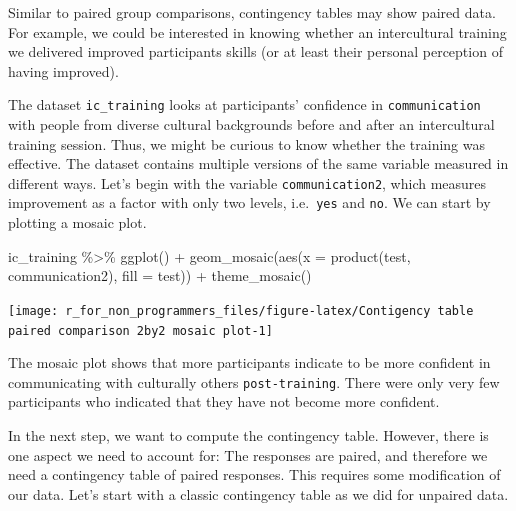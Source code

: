 \documentclass[
]{book}
\newenvironment{Shaded}{\begin{snugshade}}{\end{snugshade}}
\newcommand{\AttributeTok}[1]{\textcolor[rgb]{0.77,0.63,0.00}{#1}}
\newcommand{\FunctionTok}[1]{\textcolor[rgb]{0.00,0.00,0.00}{#1}}
\newcommand{\NormalTok}[1]{#1}
\newcommand{\SpecialCharTok}[1]{\textcolor[rgb]{0.00,0.00,0.00}{#1}}
\begin{document}
Similar to paired group comparisons, contingency tables may show paired data. For example, we could be interested in knowing whether an intercultural training we delivered improved participants skills (or at least their personal perception of having improved).

The dataset \texttt{ic\_training} looks at participants' confidence in \texttt{communication} with people from diverse cultural backgrounds before and after an intercultural training session. Thus, we might be curious to know whether the training was effective. The dataset contains multiple versions of the same variable measured in different ways. Let's begin with the variable \texttt{communication2}, which measures improvement as a factor with only two levels, i.e.~\texttt{yes} and \texttt{no}. We can start by plotting a mosaic plot.

\begin{Shaded}
\begin{Highlighting}[]
\NormalTok{ic\_training }\SpecialCharTok{\%\textgreater{}\%}
  \FunctionTok{ggplot}\NormalTok{() }\SpecialCharTok{+}
  \FunctionTok{geom\_mosaic}\NormalTok{(}\FunctionTok{aes}\NormalTok{(}\AttributeTok{x =} \FunctionTok{product}\NormalTok{(test, communication2),}
                  \AttributeTok{fill =}\NormalTok{ test)) }\SpecialCharTok{+}
  \FunctionTok{theme\_mosaic}\NormalTok{()}
\end{Highlighting}
\end{Shaded}

\begin{center}\texttt{[image: r\_for\_non\_programmers\_files/figure-latex/Contigency table paired comparison 2by2 mosaic plot-1]} \end{center}

The mosaic plot shows that more participants indicate to be more confident in communicating with culturally others \texttt{post-training}. There were only very few participants who indicated that they have not become more confident.

In the next step, we want to compute the contingency table. However, there is one aspect we need to account for: The responses are paired, and therefore we need a contingency table of paired responses. This requires some modification of our data. Let's start with a classic contingency table as we did for unpaired data.
\end{document}

